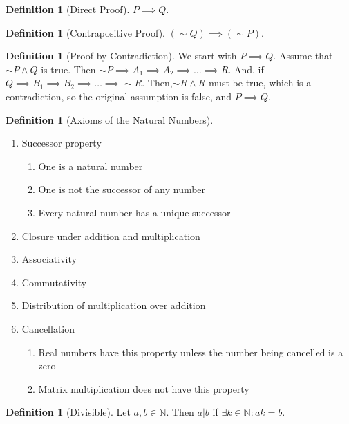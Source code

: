 \documentclass[10pt]{article}
\theoremstyle{definition}
\newtheorem{definition}[equation]{Definition}
\newcommand{\N}{\mathbb{N}}
\begin{document}
\begin{definition}[Direct Proof]
  $P\implies Q$.
\end{definition}

\begin{definition}[Contrapositive Proof]
  $(\sim Q) \implies (\sim P)$.
\end{definition}

\begin{definition}[Proof by Contradiction]
  We start with $P \implies Q$. Assume that $\sim P \land Q$ is true. Then $\sim P \implies A_1 \implies A_2 \implies \dots \implies R$. And, if $Q \implies B_1 \implies B_2 \implies \dots \implies \sim R$. Then,$\sim R \land R$ must be true, which is a contradiction, so the original assumption is false, and $P \implies Q$.
\end{definition}

\begin{definition}[Axioms of the Natural Numbers]
  \begin{enumerate}
    \item Successor property
    \begin{enumerate}
      \item One is a natural number
      \item One is not the successor of any number
      \item Every natural number has a unique successor
    \end{enumerate}
    \item Closure under addition and multiplication
    \item Associativity
    \item Commutativity
    \item Distribution of multiplication over addition
    \item Cancellation
    \begin{enumerate}
      \item Real numbers have this property unless the number being cancelled is a zero
      \item Matrix multiplication does not have this property
    \end{enumerate}
  \end{enumerate}
\end{definition}

\begin{definition}[Divisible]
  Let $a,b\in\N$. Then $a|b$ if $\exists k\in\N:ak=b$.
\end{definition}
\end{document}
